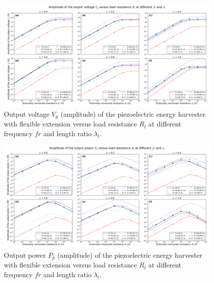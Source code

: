 \documentclass{elsarticle}
\begin{document}
\begin{figure}[!htbp]
    \centering
    \includegraphics[width=\textwidth]{./fig_vol_laml_list_vs_fr_Rl}
    \caption{Output voltage $V_p$ (amplitude) of the piezoelectric energy harvester with flexible extension versus load resistance $R_l$ at different frequency $fr$ and length ratio $\lambda_l$. }
    \label{fig:fig_vol_laml_list_vs_fr_Rl}
\end{figure}

\begin{figure}[!htbp]
    \centering
    \includegraphics[width=\textwidth]{./fig_pow_laml_list_vs_fr_Rl}
    \caption{Output power $P_p$ (amplitude) of the piezoelectric energy harvester with flexible extension versus load resistance $R_l$ at different frequency $fr$ and length ratio $\lambda_l$. }
    \label{fig:fig_pow_laml_list_vs_fr_Rl}
\end{figure}
\end{document}
